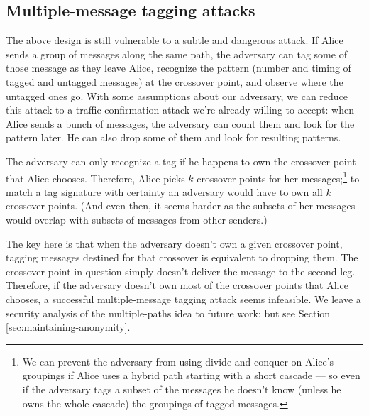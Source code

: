 \documentclass[11pt]{IEEEtran}
\begin{document}
\subsection{Multiple-message tagging attacks}
\label{subsec:multi-tagging}

The above design is still vulnerable to a subtle and dangerous
attack. If Alice sends a group of messages along the same path, the
adversary can tag some of those message as they leave Alice, recognize
the pattern (number and timing of tagged and untagged messages) at the
crossover point, and observe where the untagged ones go.
With some assumptions about our adversary, we can reduce
this attack to a traffic confirmation attack we're already willing to
accept: when Alice sends a bunch of messages, the adversary can count
them and look for the pattern later. He can also drop some of them and
look for resulting patterns.

The adversary can only recognize a tag if he happens to own the crossover
point that Alice chooses.
Therefore, Alice picks $k$ crossover points for her
messages;\footnote{
  We can prevent the adversary from using divide-and-conquer on Alice's
  groupings if Alice uses a hybrid path starting with a short cascade ---
  so even if the adversary tags a subset of the messages he doesn't know
  (unless he owns the whole cascade) the groupings of tagged messages.
}
to match a tag signature with certainty an adversary would
have to own all $k$ crossover points.  (And even then, it seems harder
as the subsets of her messages would overlap with subsets of
messages from other senders.)


The key here is that when the adversary doesn't own a given crossover
point, tagging messages destined for that crossover is equivalent to
dropping them.  The crossover point in question simply doesn't deliver
the message to the second leg. Therefore, if the adversary doesn't own
most of the crossover points that Alice chooses, a successful
multiple-message tagging attack seems infeasible.  We leave a security
analysis of the multiple-paths idea to future work; but see
Section \ref{sec:maintaining-anonymity}.
\end{document}
